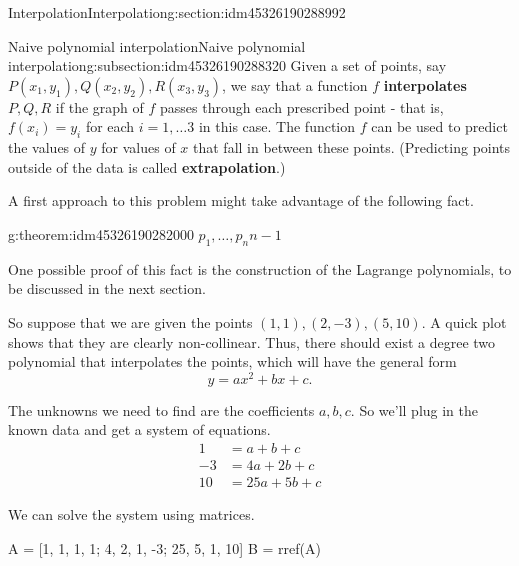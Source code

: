 \documentclass[oneside,10pt,]{article}
\newcommand{\terminology}[1]{\textbf{#1}}
\numberwithin{equation}{section}
\numberwithin{equation}{section}
\newcommand{\amp}{&}
\begin{document}
%
%
\typeout{************************************************}
\typeout{************************************************}
%
\begin{sectionptx}{Interpolation}{}{Interpolation}{}{}{g:section:idm45326190288992}
%
%
\typeout{************************************************}
\typeout{************************************************}
%
\begin{subsectionptx}{Naive polynomial interpolation}{}{Naive polynomial interpolation}{}{}{g:subsection:idm45326190288320}
Given a set of points, say \(P(x_1, y_1), Q(x_2, y_2), R(x_3, y_3)\), we say that a function \(f\) \terminology{interpolates} \(P, Q, R\) if the graph of \(f\) passes through each prescribed point - that is, \(f(x_i) = y_i\) for each \(i = 1, \ldots 3\) in this case. The function \(f\) can be used to predict the values of \(y\) for values of \(x\) that fall in between these points. (Predicting points outside of the data is called \terminology{extrapolation}.)%
\par
A first approach to this problem might take advantage of the following fact. \begin{theorem}{}{}{g:theorem:idm45326190282000}%
\(p_1, \ldots, p_n\)\(n -1\)\end{theorem}
 One possible proof of this fact is the construction of the Lagrange polynomials, to be discussed in the next section.%
\par
So suppose that we are given the points \((1,1), (2,-3), (5,10)\). A quick plot shows that they are clearly non-collinear. Thus, there should exist a degree two polynomial that interpolates the points, which will have the general form%
\begin{equation*}
y = ax^2 + bx + c.
\end{equation*}
%
\par
The unknowns we need to find are the coefficients \(a, b, c\). So we'll plug in the known data and get a system of equations.%
\begin{align*}
1 \amp= a + b + c\\
-3 \amp = 4a + 2b + c\\
10 \amp= 25a + 5b + c
\end{align*}
%
\par
We can solve the system using matrices.%
\begin{sageinput}
A = [1, 1, 1, 1;  4, 2, 1, -3; 25, 5, 1, 10]
B = rref(A)
\end{sageinput}

\end{subsectionptx}
\end{sectionptx}
\end{document}
